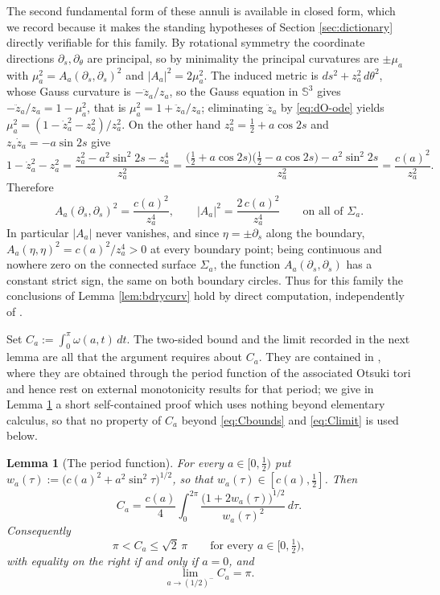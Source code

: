\documentclass[10pt,a4paper]{amsart}
\newtheorem{lemma}[theorem]{Lemma}
\newcommand{\Sph}{\mathbb{S}}
\begin{document}
The second fundamental form of these annuli is available in closed form, which we record because it makes the standing hypotheses of Section \ref{sec:dictionary} directly verifiable for this family. By rotational symmetry the coordinate directions $\partial_s,\partial_\theta$ are principal, so by minimality the principal curvatures are $\pm\mu_a$ with $\mu_a^2=A_a(\partial_s,\partial_s)^2$ and $|A_a|^2=2\mu_a^2$. The induced metric is $ds^2+z_a^2\,d\theta^2$, whose Gauss curvature is $-\ddot z_a/z_a$, so the Gauss equation in $\Sph^3$ gives $-\ddot z_a/z_a=1-\mu_a^2$, that is $\mu_a^2=1+\ddot z_a/z_a$; eliminating $\ddot z_a$ by \eqref{eq:dO-ode} yields $\mu_a^2=(1-\dot z_a^2-z_a^2)/z_a^2$. On the other hand $z_a^2=\tfrac12+a\cos 2s$ and $z_a\dot z_a=-a\sin 2s$ give
\[
1-\dot z_a^2-z_a^2=\frac{z_a^2-a^2\sin^2 2s-z_a^4}{z_a^2}
=\frac{\bigl(\tfrac12+a\cos 2s\bigr)\bigl(\tfrac12-a\cos 2s\bigr)-a^2\sin^2 2s}{z_a^2}=\frac{c(a)^2}{z_a^2} .
\]
Therefore
\begin{equation}\label{eq:Aclosed}
A_a(\partial_s,\partial_s)^2=\frac{c(a)^2}{z_a^4},\qquad |A_a|^2=\frac{2\,c(a)^2}{z_a^4}\qquad\text{on all of }\Sigma_a .
\end{equation}
In particular $|A_a|$ never vanishes, and since $\eta=\pm\partial_s$ along the boundary, $A_a(\eta,\eta)^2=c(a)^2/z_a^{4}>0$ at every boundary point; being continuous and nowhere zero on the connected surface $\Sigma_a$, the function $A_a(\partial_s,\partial_s)$ has a constant strict sign, the same on both boundary circles. Thus for this family the conclusions of Lemma \ref{lem:bdrycurv} hold by direct computation, independently of \cite{NZ1}.

Set $C_a:=\int_0^{\pi}\omega(a,t)\,dt$. The two-sided bound and the limit recorded in the next lemma are all that the argument requires about $C_a$. They are contained in \cite[Lem. 2.5]{dO24}, where they are obtained through the period function of the associated Otsuki tori and hence rest on external monotonicity results for that period; we give in Lemma \ref{lem:period} a short self-contained proof which uses nothing beyond elementary calculus, so that no property of $C_a$ beyond \eqref{eq:Cbounds} and \eqref{eq:Climit} is used below.

\begin{lemma}[The period function]\label{lem:period}
For every $a\in[0,\tfrac12)$ put $w_a(\tau):=\bigl(c(a)^2+a^2\sin^2\tau\bigr)^{1/2}$, so that $w_a(\tau)\in[c(a),\tfrac12]$. Then
\begin{equation}\label{eq:Cclosed}
C_a=\frac{c(a)}{4}\int_0^{2\pi}\frac{\bigl(1+2w_a(\tau)\bigr)^{1/2}}{w_a(\tau)^2}\,d\tau .
\end{equation}
Consequently
\begin{equation}\label{eq:Cbounds}
\pi<C_a\leq\sqrt2\,\pi\qquad\text{for every }a\in\bigl[0,\tfrac12\bigr),
\end{equation}
with equality on the right if and only if $a=0$, and
\begin{equation}\label{eq:Climit}
\lim_{a\to(1/2)^-}C_a=\pi .
\end{equation}
\end{lemma}
\end{document}
